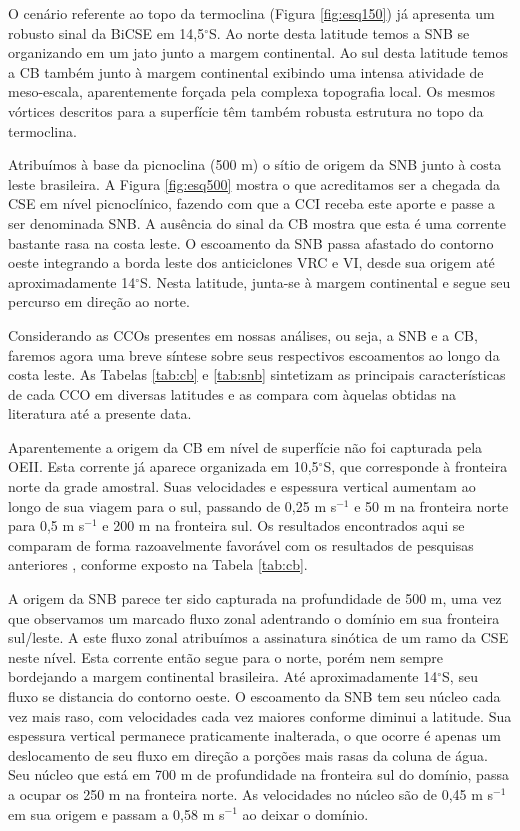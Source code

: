 O cenário referente ao topo da termoclina (Figura \ref{fig:esq150}) já apresenta um robusto sinal da BiCSE em 
14,5$^\circ$S. Ao norte desta latitude temos a SNB se organizando em um jato junto a margem continental. Ao sul desta
latitude temos a CB também junto à margem continental exibindo uma intensa atividade de meso-escala, aparentemente
forçada pela complexa topografia local. Os mesmos vórtices descritos para a superfície têm também robusta estrutura 
no topo da termoclina. 

Atribuímos à base da picnoclina (500 m) o sítio de origem da SNB junto à costa leste brasileira.
A Figura \ref{fig:esq500} mostra
o que acreditamos ser a chegada da CSE em nível picnoclínico, fazendo com que a CCI receba este aporte e passe a ser
denominada SNB. A ausência do sinal da CB mostra que esta é uma corrente bastante rasa na costa leste. O escoamento
da SNB passa afastado do contorno oeste integrando a borda leste dos anticiclones VRC e VI, desde sua origem até 
aproximadamente 14$^\circ$S. Nesta latitude, junta-se à margem continental e segue seu percurso em direção ao norte.  

Considerando as CCOs presentes em nossas análises, ou seja, a SNB e a CB, faremos agora uma breve síntese sobre
seus respectivos escoamentos ao longo da costa leste. As Tabelas \ref{tab:cb} e \ref{tab:snb} sintetizam as principais características
de cada CCO em diversas latitudes e as compara com àquelas obtidas na literatura até a presente data. 

Aparentemente a origem da CB em nível de superfície não foi capturada pela OEII. Esta corrente já aparece
organizada em 10,5$^\circ$S, que corresponde à fronteira norte da grade amostral. Suas velocidades e espessura
vertical aumentam ao longo de sua viagem para o sul, passando de 0,25 m s$^{-1}$ e 50 m na fronteira norte para
0,5 m s$^{-1}$ e 200 m na fronteira sul. Os resultados encontrados aqui se comparam de forma razoavelmente favorável
com os resultados de pesquisas anteriores \citep{miranda_castro1981,soutelino2005,silveira_etal2006B},
conforme exposto na Tabela \ref{tab:cb}.

A origem da SNB parece ter sido capturada na profundidade de 500 m, uma vez que observamos um marcado 
fluxo zonal adentrando o domínio em sua fronteira sul/leste. A este fluxo zonal atribuímos a assinatura
sinótica de um ramo da CSE neste nível. Esta corrente então segue para o norte, porém nem sempre bordejando 
a margem continental brasileira. Até aproximadamente 14$^\circ$S, seu fluxo se distancia 
do contorno oeste. O escoamento da SNB tem seu núcleo cada vez mais raso, com velocidades 
cada vez maiores conforme diminui a latitude. Sua espessura vertical permanece praticamente inalterada, o que ocorre é apenas um
deslocamento de seu fluxo em direção a porções mais rasas da coluna de água. Seu núcleo que está em 700 m de profundidade
na fronteira sul do domínio, passa a ocupar os 250 m na fronteira norte. As velocidades no núcleo são de 0,45 m s$^{-1}$
em sua origem e passam a 0,58 m s$^{-1}$ ao deixar o domínio. 

